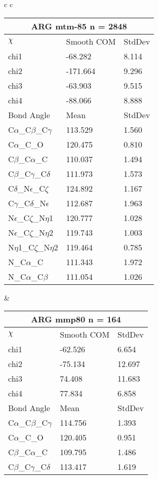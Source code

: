 \begin{longtable}{ c c }
\begin{tabular}{ l l l }
  \toprule
  \multicolumn{3}{c}{ARG \textbf{mtm-85} n = 2848} \\ \toprule
  $\chi$       & Smooth COM & StdDev \\ \midrule
  chi1 & -68.282 & 8.114 \\ 
  chi2 & -171.664 & 9.296 \\ 
  chi3 & -63.903 & 9.515 \\ 
  chi4 & -88.066 & 8.888 \\ \midrule
  Bond Angle   & Mean     & StdDev \\ \midrule
  C$\alpha$\_C$\beta$\_C$\gamma$ & 113.529 & 1.560\\
  C$\alpha$\_C\_O & 120.475 & 0.810\\
  C$\beta$\_C$\alpha$\_C & 110.037 & 1.494\\
  C$\beta$\_C$\gamma$\_C$\delta$ & 111.973 & 1.573\\
  C$\delta$\_N$\epsilon$\_C$\zeta$ & 124.892 & 1.167\\
  C$\gamma$\_C$\delta$\_N$\epsilon$ & 112.687 & 1.963\\
  N$\epsilon$\_C$\zeta$\_N$\eta$1 & 120.777 & 1.028\\
  N$\epsilon$\_C$\zeta$\_N$\eta$2 & 119.743 & 1.003\\
  N$\eta$1\_C$\zeta$\_N$\eta$2 & 119.464 & 0.785\\
  N\_C$\alpha$\_C & 111.343 & 1.972\\
  N\_C$\alpha$\_C$\beta$ & 111.054 & 1.026\\
  \bottomrule
  \end{tabular}
  &
  \begin{tabular}{ l l l }
  \toprule
  \multicolumn{3}{c}{ARG \textbf{mmp80} n = 164} \\ \toprule
  $\chi$       & Smooth COM & StdDev \\ \midrule
  chi1 & -62.526 & 6.654 \\ 
  chi2 & -75.134 & 12.697 \\ 
  chi3 & 74.408 & 11.683 \\ 
  chi4 & 77.834 & 6.858 \\ \midrule
  Bond Angle   & Mean     & StdDev \\ \midrule
  C$\alpha$\_C$\beta$\_C$\gamma$ & 114.756 & 1.393\\
  C$\alpha$\_C\_O & 120.405 & 0.951\\
  C$\beta$\_C$\alpha$\_C & 109.795 & 1.486\\
  C$\beta$\_C$\gamma$\_C$\delta$ & 113.417 & 1.619\\

\end{tabular}
\end{longtable}
